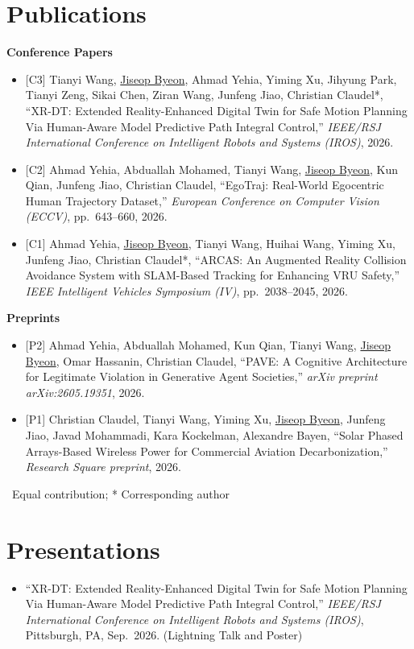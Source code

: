 \documentclass[10pt]{article}
\let\oldsection\section
\renewcommand{\section}[1]{\needspace{7\baselineskip}\oldsection{#1}}
\newcommand{\me}{\uline{Jiseop Byeon}}
\newcommand{\gap}{\vspace{6pt}}
\newcommand{\subhead}[1]{\par\needspace{4\baselineskip}\noindent\textbf{#1}\par}
\begin{document}
\section{Publications}
\subhead{Conference Papers}
\begin{itemize}
  \item {[C3]} Tianyi Wang\textdagger, \me\textdagger, Ahmad Yehia\textdagger, Yiming Xu, Jihyung Park, Tianyi Zeng,
        Sikai Chen, Ziran Wang, Junfeng Jiao, Christian Claudel*,
        ``XR-DT: Extended Reality-Enhanced Digital Twin for Safe Motion Planning Via Human-Aware Model Predictive
        Path Integral Control,'' \textit{IEEE/RSJ International Conference on Intelligent Robots and Systems (IROS)}, 2026.
  \item {[C2]} Ahmad Yehia, Abduallah Mohamed, Tianyi Wang, \me, Kun Qian, Junfeng Jiao, Christian Claudel,
        ``EgoTraj: Real-World Egocentric Human Trajectory Dataset,''
        \textit{European Conference on Computer Vision (ECCV)}, pp.~643--660, 2026.
  \item {[C1]} Ahmad Yehia\textdagger, \me\textdagger, Tianyi Wang\textdagger, Huihai Wang, Yiming Xu, Junfeng Jiao,
        Christian Claudel*,
        ``ARCAS: An Augmented Reality Collision Avoidance System with SLAM-Based Tracking for Enhancing VRU Safety,''
        \textit{IEEE Intelligent Vehicles Symposium (IV)}, pp.~2038--2045, 2026.
\end{itemize}
\gap

\subhead{Preprints}
\begin{itemize}
  \item {[P2]} Ahmad Yehia, Abduallah Mohamed, Kun Qian, Tianyi Wang, \me, Omar Hassanin, Christian Claudel,
        ``PAVE: A Cognitive Architecture for Legitimate Violation in Generative Agent Societies,''
        \textit{arXiv preprint arXiv:2605.19351}, 2026.
  \item {[P1]} Christian Claudel, Tianyi Wang, Yiming Xu, \me, Junfeng Jiao, Javad Mohammadi, Kara Kockelman,
        Alexandre Bayen,
        ``Solar Phased Arrays-Based Wireless Power for Commercial Aviation Decarbonization,''
        \textit{Research Square preprint}, 2026.
\end{itemize}
{\small \textdagger\ Equal contribution; * Corresponding author}

\section{Presentations}
\begin{itemize}
  \item ``XR-DT: Extended Reality-Enhanced Digital Twin for Safe Motion Planning Via Human-Aware Model Predictive
        Path Integral Control,'' \textit{IEEE/RSJ International Conference on Intelligent Robots and Systems (IROS)},
        Pittsburgh, PA, Sep.~2026. (Lightning Talk and Poster)
\end{itemize}
\end{document}
